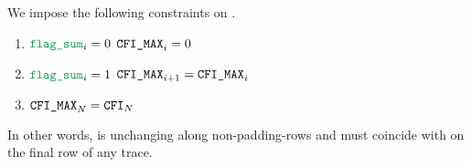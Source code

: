 We impose the following constraints on \romColumnCfiMax{}.
\begin{enumerate}
    \item \If $\flagSum _{i} = 0$ \Then $\texttt{CFI\_MAX} _{i}     = 0$
    \item \If $\flagSum _{i} = 1$ \Then $\texttt{CFI\_MAX} _{i + 1} = \texttt{CFI\_MAX} _{i}$
    \item $\texttt{CFI\_MAX} _{N} = \texttt{CFI} _{N}$
\end{enumerate}
\saNote{}
In other words, \romColumnCfiMax{} is unchanging along non-padding-rows
and must coincide with \cfi{} on the final row of any trace.
